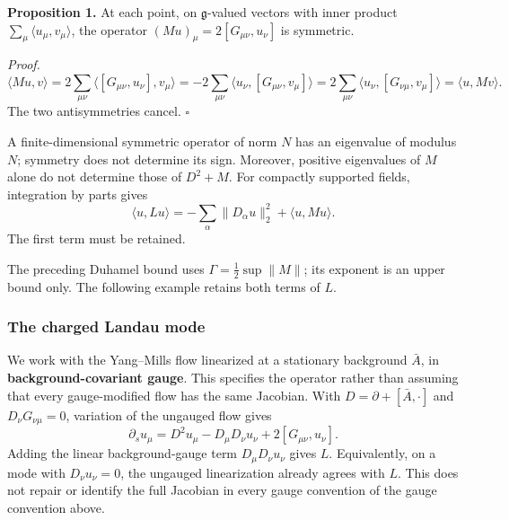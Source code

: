 \documentclass[11pt,a4paper]{article}
\begin{document}
\textbf{Proposition 1.} At each point, on \(\mathfrak g\)-valued vectors
with inner product \(\sum_\mu\langle u_\mu,v_\mu\rangle\), the operator
\((Mu)_\mu=2[G_{\mu\nu},u_\nu]\) is symmetric.

\emph{Proof.} \[\langle Mu,v\rangle
=2\sum_{\mu\nu}\langle[G_{\mu\nu},u_\nu],v_\mu\rangle
=-2\sum_{\mu\nu}\langle u_\nu,[G_{\mu\nu},v_\mu]\rangle
=2\sum_{\mu\nu}\langle u_\nu,[G_{\nu\mu},v_\mu]\rangle
=\langle u,Mv\rangle.\] The two antisymmetries cancel. \(\square\)

A finite-dimensional symmetric operator of norm \(N\) has an eigenvalue
of modulus \(N\); symmetry does not determine its sign. Moreover,
positive eigenvalues of \(M\) alone do not determine those of \(D^2+M\).
For compactly supported fields, integration by parts gives
\[\langle u,Lu\rangle=-\sum_\alpha\|D_\alpha u\|_2^2
+\langle u,Mu\rangle.\] The first term must be retained.

The preceding Duhamel bound uses \(\Gamma=\frac12\sup\|M\|\); its
exponent is an upper bound only. The following example retains both
terms of \(L\).

\hypertarget{the-charged-landau-mode}{%
\subsubsection{The charged Landau mode}\label{the-charged-landau-mode}}

We work with the Yang--Mills flow linearized at a stationary background
\(\bar A\), in \textbf{background-covariant gauge}. This specifies the
operator rather than assuming that every gauge-modified flow has the
same Jacobian. With \(D=\partial+[\bar A,\cdot]\) and
\(D_\nu G_{\nu\mu}=0\), variation of the ungauged flow gives
\[\partial_su_\mu=D^2u_\mu-D_\mu D_\nu u_\nu
+2[G_{\mu\nu},u_\nu].\] Adding the linear background-gauge term
\(D_\mu D_\nu u_\nu\) gives \(L\). Equivalently, on a mode with
\(D_\nu u_\nu=0\), the ungauged linearization already agrees with \(L\).
This does not repair or identify the full Jacobian in every gauge
convention of the gauge convention above.
\end{document}
